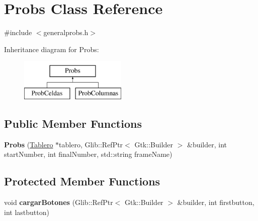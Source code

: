 \hypertarget{classProbs}{\section{Probs Class Reference}
\label{classProbs}
}


{\ttfamily \#include $<$generalprobs.\-h$>$}

Inheritance diagram for Probs\-:\begin{figure}[H]
\begin{center}
\leavevmode
\includegraphics[height=2.000000cm]{classProbs}
\end{center}
\end{figure}
\subsection*{Public Member Functions}
\begin{DoxyCompactItemize}
\item 
\hypertarget{classProbs_ae64395229e694c15a5167cb99625bcf2}{{\bfseries Probs} (\hyperlink{classTablero}{Tablero} $\ast$tablero, Glib\-::\-Ref\-Ptr$<$ Gtk\-::\-Builder $>$ \&builder, int start\-Number, int final\-Number, std\-::string frame\-Name)}\label{classProbs_ae64395229e694c15a5167cb99625bcf2}

\end{DoxyCompactItemize}
\subsection*{Protected Member Functions}
\begin{DoxyCompactItemize}
\item 
\hypertarget{classProbs_a8749c6a4f39c23c92ed522ac22fe4e26}{void {\bfseries cargar\-Botones} (Glib\-::\-Ref\-Ptr$<$ Gtk\-::\-Builder $>$ \&builder, int firstbutton, int lastbutton)}\label{classProbs_a8749c6a4f39c23c92ed522ac22fe4e26}

\end{DoxyCompactItemize}
